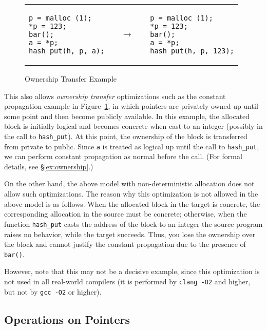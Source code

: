 \begin{figure}[t]
\center
\begin{tabular}{lll}
\begin{lstlisting}
p = malloc (1);
*p = 123;
bar();
a = *p;
hash_put(h, p, a);
\end{lstlisting}
&
$\quad\rightarrow\quad$
&
\begin{lstlisting}
p = malloc (1);
*p = 123;
bar();
a = *p;
hash_put(h, p, 123);
\end{lstlisting}
\end{tabular}
\caption{Ownership Transfer Example}\label{code:ownership}
\end{figure}

This also allows \emph{ownership transfer} optimizations such as the
constant propagation example in Figure~\ref{code:ownership}, in which
pointers are privately owned up until some point and then become
publicly available.  
In this example,
the allocated block is initially logical and becomes concrete when cast to an
integer (possibly in the call to \texttt{hash\_put}). At this point, the ownership of the block is transferred from
private to public. Since \texttt{a} is treated as logical up until the
call to \texttt{hash\_put}, we can perform constant propagation as
normal before the call. (For formal details, see \S\ref{ex:ownership}.)

On the other hand, the above model with
non-deterministic allocation does not allow such optimizations.
The reason why this optimization is not allowed in the above model is
as follows.
When the allocated block in the target is concrete, the
  corresponding allocation in the source must be concrete; otherwise,
  when the function \texttt{hash\_put} casts the address of the block to
  an integer the source program raises no behavior, while the target succeeds.
Thus, you lose the ownership over the block and cannot justify the constant propagation due to the presence of \texttt{bar()}.


   However, note that this may not be a decisive example, since this
   optimization is not used in all real-world compilers (it is
   performed by \texttt{clang -O2} and higher, but not by \texttt{gcc
     -O2} or higher).

\subsection{Operations on Pointers}

